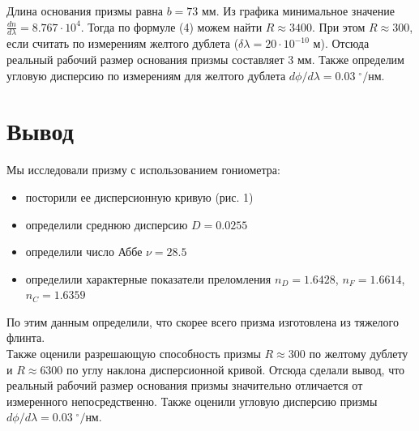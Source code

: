 \documentclass[a4paper,12pt]{article}
\begin{document}
\noindent
Длина основания призмы равна $b = 73$ мм. Из графика минимальное значение $\frac{dn}{d\lambda} = 8.767 \cdot 10^4$. Тогда по формуле (4) можем найти $R \approx 3400$. При этом $R \approx 300$, если считать по измерениям желтого дублета ($\delta \lambda = 20 \cdot 10^{-10}$ м). Отсюда реальный рабочий размер основания призмы составляет $3$ мм. Также определим угловую дисперсию по измерениям для желтого дублета $d\phi/d\lambda = 0.03 \; ^\circ/\text{нм}$.


\section*{Вывод}
Мы исследовали призму с использованием гониометра: 
\begin{itemize}
    \item посторили ее дисперсионную кривую (рис. 1)
    \item определили среднюю дисперсию $D = 0.0255$
    \item определили число Аббе $\nu = 28.5$
    \item определили характерные показатели преломления $n_D = 1.6428$, $n_F = 1.6614$, $n_C = 1.6359$
\end{itemize}
По этим данным определили, что скорее всего призма изготовлена из тяжелого флинта. \\
Также оценили разрешающую способность призмы $R \approx 300$ по желтому дублету и $R \approx 6300$ по углу наклона дисперсионной кривой. Отсюда сделали вывод, что реальный рабочий размер основания призмы значительно отличается от измеренного непосредственно. Также оценили угловую дисперсию призмы $d\phi/d\lambda = 0.03 \; ^\circ/\text{нм}$.
\end{document}
